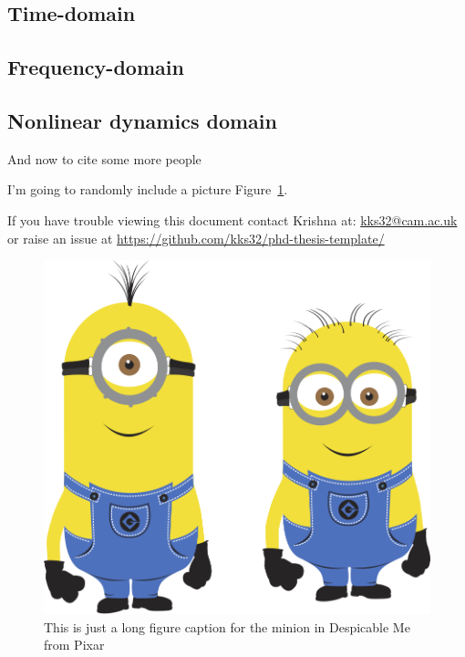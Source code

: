 \subsection{Time-domain}
\lipsum[1-4]

\subsection{Frequency-domain}
\subsection{Nonlinear dynamics domain}
And now to cite some more people~\citet{Rea85,Ancey1996}


I'm going to randomly include a picture Figure~\ref{fig:minion}.


If you have trouble viewing this document contact Krishna at: \href{mailto:kks32@cam.ac.uk}{kks32@cam.ac.uk} or raise an issue at \url{https://github.com/kks32/phd-thesis-template/}


\begin{figure}[htbp!]
\centering
\includegraphics[width=1.0\textwidth]{minion}
\caption[Minion]{This is just a long figure caption for the minion in Despicable Me from Pixar}
\label{fig:minion}
\end{figure}
